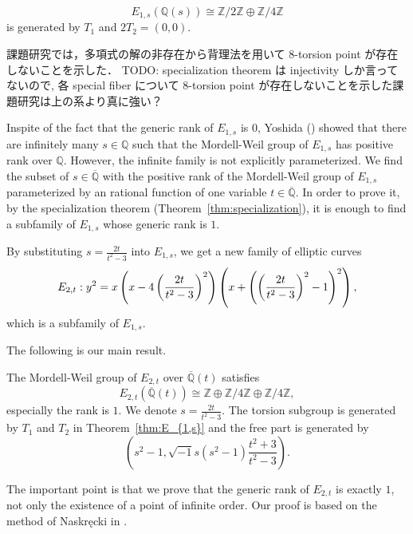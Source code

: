 \documentclass[main]{subfiles}
\begin{document}
\begin{cor}
    \begin{equation}
        E_{1,s}(\mathbb{Q}(s)) \cong \mathbb{Z} / 2 \mathbb{Z} \oplus \mathbb{Z} / 4 \mathbb{Z}
    \end{equation}
    is generated by $T_1$ and $2T_2=(0,0)$.
\end{cor}

\begin{rem}
    課題研究では，多項式の解の非存在から背理法を用いて 8-torsion point が存在しないことを示した．
    TODO: specialization theorem は injectivity しか言ってないので, 各 special fiber について 8-torsion point が存在しないことを示した課題研究は上の系より真に強い？
\end{rem}

Inspite of the fact that the generic rank of $E_{1,s}$ is $0$, Yoshida (\cite[Corollary 4.7.]{ref:yoshida}) showed that there are infinitely many $s \in \mathbb{Q}$ such that the Mordell-Weil group of $E_{1,s}$ has positive rank over $\mathbb{Q}$.
However, the infinite family is not explicitly parameterized.
We find the subset of $s \in \overline{{\mathbb{Q}}}$ with the positive rank of the Mordell-Weil group of $E_{1,s}$ parameterized by an rational function of one variable $t \in \overline{\mathbb{Q}}$.
In order to prove it, by the specialization theorem (Theorem~\ref{thm:specialization}), it is enough to find a subfamily of $E_{1,s}$ whose generic rank is $1$.

By substituting $s = \frac{2t}{t^{2} - 3}$ into $E_{1,s}$, we get a new family of elliptic curves
\begin{equation}
    \label{eq:E_{2,t}}
        E_{2,t}: y^{2} = x\left(x - 4\left(\frac{2t}{t^{2} - 3}\right)^{2}\right)\left(x + \left(\left(\frac{2t}{t^{2} - 3}\right)^{2} - 1\right)^{2}\right),
    \end{equation}
which is a subfamily of $E_{1,s}$.

The following is our main result.
\begin{thm}
    \label{thm:E_{2,t}}
    The Mordell-Weil group of $E_{2,t}$ over $\overline{\mathbb{Q}}(t)$ satisfies
    \begin{equation}
        E_{2,t}(\overline{\mathbb{Q}}(t)) \cong \mathbb{Z} \oplus \mathbb{Z} / 4 \mathbb{Z} \oplus \mathbb{Z} / 4 \mathbb{Z},
    \end{equation}
    especially the rank is $1$.
    We denote $s = \frac{2t}{t^{2} - 3}$. The torsion subgroup is generated by $T_1$ and $T_2$ in Theorem~\ref{thm:E_{1,s}} and the free part is generated by
    \begin{equation}
        \left(s^{2} - 1, \sqrt{-1} s(s^{2} - 1) \frac{t^{2} + 3}{t^{2} - 3} \right).
    \end{equation}
\end{thm}
The important point is that we prove that the generic rank of $E_{2,t}$ is exactly $1$, not only the existence of a point of infinite order.
Our proof is based on the method of Naskręcki in \cite{ref:naskrecki2013}.
\end{document}

